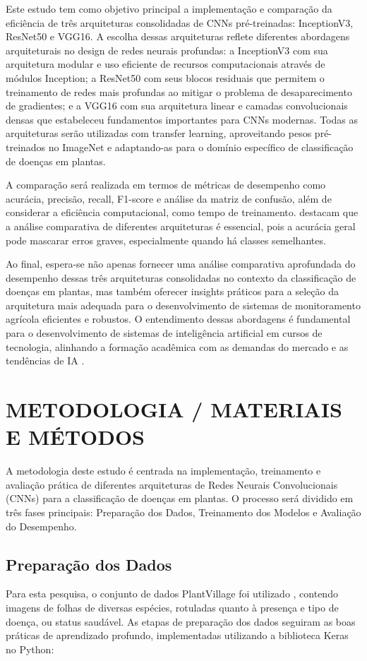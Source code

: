 \documentclass[12pt]{article}
\begin{document}
Este estudo tem como objetivo principal a implementação e comparação da eficiência de três arquiteturas consolidadas de CNNs pré-treinadas: InceptionV3, ResNet50 e VGG16. A escolha dessas arquiteturas reflete diferentes abordagens arquiteturais no design de redes neurais profundas: a InceptionV3 com sua arquitetura modular e uso eficiente de recursos computacionais através de módulos Inception; a ResNet50 com seus blocos residuais que permitem o treinamento de redes mais profundas ao mitigar o problema de desaparecimento de gradientes; e a VGG16 com sua arquitetura linear e camadas convolucionais densas que estabeleceu fundamentos importantes para CNNs modernas. Todas as arquiteturas serão utilizadas com transfer learning, aproveitando pesos pré-treinados no ImageNet e adaptando-as para o domínio específico de classificação de doenças em plantas.

A comparação será realizada em termos de métricas de desempenho como acurácia, precisão, recall, F1-score e análise da matriz de confusão, além de considerar a eficiência computacional, como tempo de treinamento. \cite{tessele2024modelo} destacam que a análise comparativa de diferentes arquiteturas é essencial, pois a acurácia geral pode mascarar erros graves, especialmente quando há classes semelhantes. 

Ao final, espera-se não apenas fornecer uma análise comparativa aprofundada do desempenho dessas três arquiteturas consolidadas no contexto da classificação de doenças em plantas, mas também oferecer insights práticos para a seleção da arquitetura mais adequada para o desenvolvimento de sistemas de monitoramento agrícola eficientes e robustos. O entendimento dessas abordagens é fundamental para o desenvolvimento de sistemas de inteligência artificial em cursos de tecnologia, alinhando a formação acadêmica com as demandas do mercado e as tendências de IA \cite{vicari2021influencias}.

\section{METODOLOGIA / MATERIAIS E MÉTODOS} 
A metodologia deste estudo é centrada na implementação, treinamento e avaliação prática de diferentes arquiteturas de Redes Neurais Convolucionais (CNNs) para a classificação de doenças em plantas. O processo será dividido em três fases principais: Preparação dos Dados, Treinamento dos Modelos e Avaliação do Desempenho. 
\subsection{Preparação dos Dados}
Para esta pesquisa, o conjunto de dados PlantVillage foi utilizado \cite{hughes2015open}, contendo imagens de folhas de diversas espécies, rotuladas quanto à presença e tipo de doença, ou status saudável. As etapas de preparação dos dados seguiram as boas práticas de aprendizado profundo, implementadas utilizando a biblioteca Keras no Python: 
\end{document}
